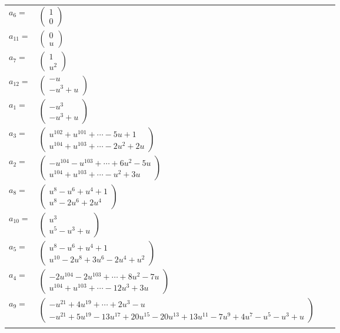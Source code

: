 \documentclass[1p]{elsarticle_modified}
\theoremstyle{definition}
\begin{document}
\begin{tabular}{m{7pt} m{180pt} m{7pt} m{180pt} }
\flushright $a_{6}=$&$\begin{pmatrix}1\\0\end{pmatrix}$ \\
\flushright $a_{11}=$&$\begin{pmatrix}0\\u\end{pmatrix}$ \\
\flushright $a_{7}=$&$\begin{pmatrix}1\\u^2\end{pmatrix}$ \\
\flushright $a_{12}=$&$\begin{pmatrix}- u\\- u^3+u\end{pmatrix}$ \\
\flushright $a_{1}=$&$\begin{pmatrix}- u^3\\- u^3+u\end{pmatrix}$ \\
\flushright $a_{3}=$&$\begin{pmatrix}u^{102}+u^{101}+\cdots-5 u+1\\u^{104}+u^{103}+\cdots-2 u^2+2 u\end{pmatrix}$ \\
\flushright $a_{2}=$&$\begin{pmatrix}- u^{104}- u^{103}+\cdots+6 u^2-5 u\\u^{104}+u^{103}+\cdots- u^2+3 u\end{pmatrix}$ \\
\flushright $a_{8}=$&$\begin{pmatrix}u^8- u^6+u^4+1\\u^8-2 u^6+2 u^4\end{pmatrix}$ \\
\flushright $a_{10}=$&$\begin{pmatrix}u^3\\u^5- u^3+u\end{pmatrix}$ \\
\flushright $a_{5}=$&$\begin{pmatrix}u^8- u^6+u^4+1\\u^{10}-2 u^8+3 u^6-2 u^4+u^2\end{pmatrix}$ \\
\flushright $a_{4}=$&$\begin{pmatrix}-2 u^{104}-2 u^{103}+\cdots+8 u^2-7 u\\u^{104}+u^{103}+\cdots-12 u^3+3 u\end{pmatrix}$ \\
\flushright $a_{9}=$&$\begin{pmatrix}- u^{21}+4 u^{19}+\cdots+2 u^3- u\\- u^{21}+5 u^{19}-13 u^{17}+20 u^{15}-20 u^{13}+13 u^{11}-7 u^9+4 u^7- u^5- u^3+u\end{pmatrix}$\\&\end{tabular}
\end{document}
